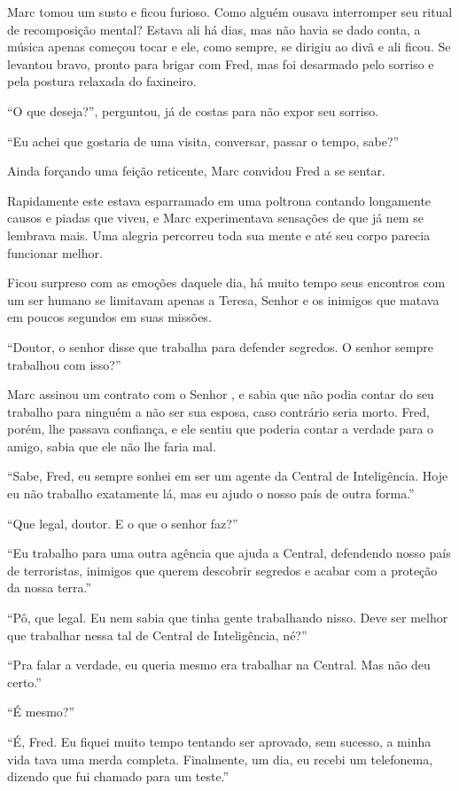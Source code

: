Marc tomou um susto e ficou furioso. Como alguém ousava interromper seu
ritual de recomposição mental? Estava ali há dias, mas não havia se dado
conta, a música apenas começou tocar e ele, como sempre, se dirigiu ao
divã e ali ficou. Se levantou bravo, pronto para brigar com Fred, mas
foi desarmado pelo sorriso e pela postura relaxada do faxineiro.

``O que deseja?'', perguntou, já de costas para não expor seu sorriso.

``Eu achei que gostaria de uma visita, conversar, passar o tempo,
sabe?''

Ainda forçando uma feição reticente, Marc convidou Fred a se sentar.

Rapidamente este estava esparramado em uma poltrona contando
longamente causos e piadas que viveu, e Marc experimentava sensações de que
já nem se lembrava mais. Uma alegria percorreu toda sua mente e
até seu corpo parecia funcionar melhor.

Ficou surpreso com as emoções daquele dia, há muito tempo seus encontros
com um ser humano se limitavam apenas a Teresa, Senhor  e os inimigos
que matava em poucos segundos em suas missões.

``Doutor, o senhor disse que trabalha para defender segredos. O senhor
sempre trabalhou com isso?''

Marc assinou um contrato com o Senhor , e sabia que não podia
contar do seu trabalho para ninguém a não ser sua esposa, caso contrário
seria morto. Fred, porém, lhe passava confiança, e ele sentiu que poderia
contar a verdade para o amigo, sabia que ele não lhe faria mal.

``Sabe, Fred, eu sempre sonhei em ser um agente da Central de
Inteligência. Hoje eu não trabalho exatamente lá, mas eu ajudo o nosso
país de outra forma.''

``Que legal, doutor. E o que o senhor faz?''

``Eu trabalho para uma outra agência que ajuda a Central, defendendo
nosso país de terroristas, inimigos que querem descobrir segredos e
acabar com a proteção da nossa terra.''

``Pô, que legal. Eu nem sabia que tinha gente trabalhando nisso. Deve
ser melhor que trabalhar nessa tal de Central de Inteligência, né?''

``Pra falar a verdade, eu queria mesmo era trabalhar na Central. Mas não
deu certo.''

``É mesmo?''

``É, Fred. Eu fiquei muito tempo tentando ser aprovado, sem sucesso, a
minha vida tava uma merda completa. Finalmente, um dia, eu recebi um
telefonema, dizendo que fui chamado para um teste.''

